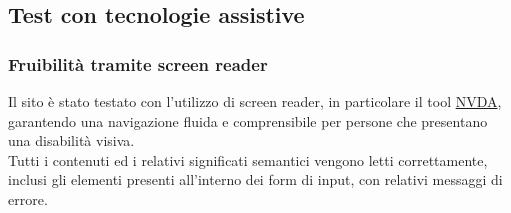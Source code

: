 \documentclass[a4paper,10pt]{article}
\begin{document}
	\subsection{Test con tecnologie assistive}
	
	\subsubsection{Fruibilità tramite screen reader}
	Il sito è stato testato con l'utilizzo di screen reader, in particolare il tool \href{https://www.nvda.it/}{NVDA}, garantendo una navigazione fluida e comprensibile per persone che presentano una disabilità visiva.\\
	Tutti i contenuti ed i relativi significati semantici vengono letti correttamente, inclusi gli elementi presenti all'interno dei form di input, con relativi messaggi di errore.\\
	
\end{document}
